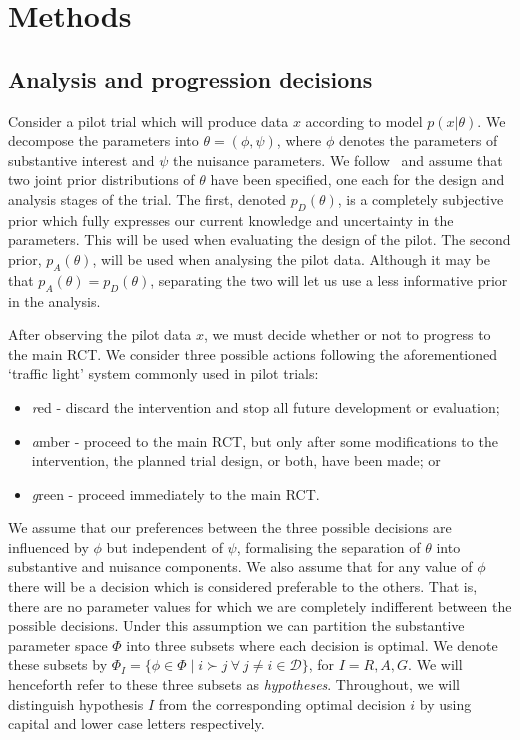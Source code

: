 \documentclass{article} %
\begin{document}
\section{Methods}\label{sec:methods}

\subsection{Analysis and progression decisions}\label{sec:analysis}

Consider a pilot trial which will produce data $x$ according to model $p(x | \theta)$. We decompose the parameters into $\theta = (\phi, \psi)$, where $\phi$ denotes the parameters of substantive interest and $\psi$ the nuisance parameters. We follow~\cite{Wang2002} and assume that two joint prior distributions of $\theta$ have been specified, one each for the design and analysis stages of the trial. The first, denoted $p_{D}(\theta)$, is a completely subjective prior which fully expresses our current knowledge and uncertainty in the parameters. This will be used when evaluating the design of the pilot. The second prior, $p_A(\theta)$, will be used when analysing the pilot data. Although it may be that $p_A(\theta) = p_D(\theta)$, separating the two will let us use a less informative prior in the analysis.


After observing the pilot data $x$, we must decide whether or not to progress to the main RCT. We consider three possible actions following the aforementioned `traffic light' system commonly used in pilot trials: 
\begin{itemize}
\item \emph{r}ed - discard the intervention and stop all future development or evaluation; 
\item \emph{a}mber - proceed to the main RCT, but only after some modifications to the intervention, the planned trial design, or both, have been made; or
\item \emph{g}reen - proceed immediately to the main RCT.
\end{itemize}
 
We assume that our preferences between the three possible decisions are influenced by $\phi$ but independent of $\psi$, formalising the separation of $\theta$ into substantive and nuisance components. We also assume that for any value of $\phi$ there will be a decision which is considered preferable to the others. That is, there are no parameter values for which we are completely indifferent between the possible decisions. Under this assumption we can partition the substantive parameter space $\Phi$ into three subsets where each decision is optimal. We denote these subsets by $\Phi_{I} = \{ \phi \in \Phi \mid i \succ j ~\forall ~j \neq i \in \mathcal{D} \}$, for $I = R, A, G$. We will henceforth refer to these three subsets as \emph{hypotheses}. Throughout, we will distinguish hypothesis $I$ from the corresponding optimal decision $i$ by using capital and lower case letters respectively.
\end{document}
